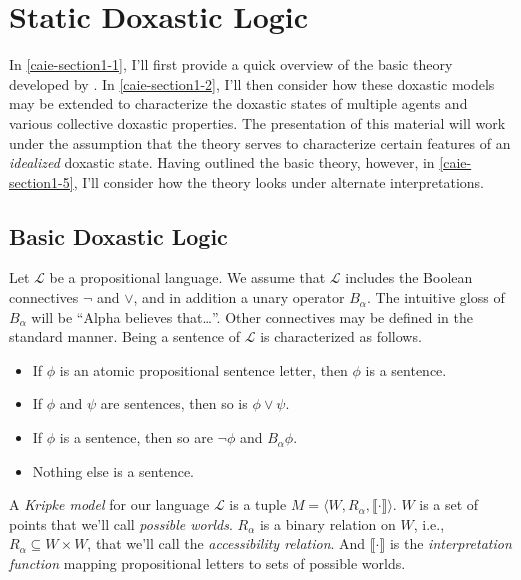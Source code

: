 \section{Static Doxastic Logic}\label{caie-section1}

In \autoref{caie-section1-1}, I'll first provide a quick overview of the basic theory developed by \citet{Hintikka1}.
In \autoref{caie-section1-2}, I'll then consider how these doxastic models may be extended to characterize the doxastic states of multiple agents and various collective doxastic properties.
The presentation of this material will work under the assumption that the theory serves to characterize certain features of an \textit{idealized} doxastic state.
Having outlined the basic theory, however, in \autoref{caie-section1-5}, I'll consider how the theory looks under alternate interpretations.


\subsection{Basic Doxastic Logic}\label{caie-section1-1}


Let $\mathcal{L}$ be a propositional language.
We assume that $\mathcal{L}$ includes the Boolean connectives $\lnot$ and $\vee$, and in addition a unary operator $B_\alpha$.
The intuitive gloss of $B_\alpha$ will be ``Alpha believes that\ldots''.
Other connectives may be defined in the standard manner.
Being a sentence of $\mathcal{L}$ is characterized as follows.
\begin{itemize}
\item If $\phi$ is an atomic propositional sentence letter, then $\phi$ is a sentence.
\item If $\phi$ and $\psi$ are sentences, then so is $\phi \vee \psi$.
\item If $\phi$ is a sentence, then so are $\lnot \phi$ and $B_\alpha \phi$.
\item Nothing else is a sentence.
\end{itemize}

A \textit{Kripke model} for our language $\mathcal{L}$ is a tuple $M = \langle W, R_\alpha, \llbracket \cdot \rrbracket \rangle$.
$W$ is a set of points that we'll call \textit{possible worlds}.
$R_\alpha$ is a binary relation on $W$, i.e., $R_\alpha \subseteq W \times W$, that we'll call the \textit{accessibility relation}.
And $\llbracket \cdot \rrbracket$ is the \textit{interpretation function} mapping propositional letters to sets of possible worlds.

